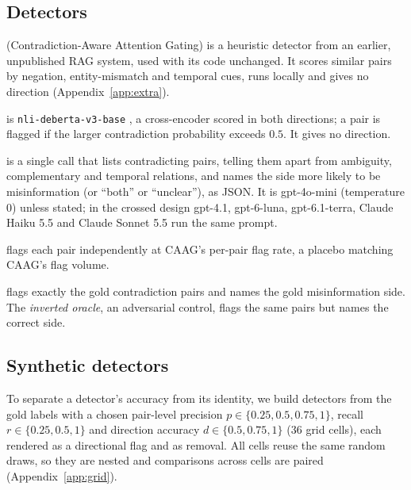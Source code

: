 \subsection{Detectors}
\label{sec:detectors}
\begin{description}[leftmargin=0pt,itemsep=1pt,topsep=2pt]
\item[CAAG] (Contradiction-Aware Attention Gating) is a heuristic detector from an earlier, unpublished RAG system,
used with its code unchanged. It scores similar pairs by negation, entity-mismatch and temporal cues, runs locally
and gives no direction (Appendix~\ref{app:extra}).
\item[NLI] is \texttt{nli-deberta-v3-base} \citep{he2023debertav3}, a cross-encoder scored in both directions; a pair is
flagged if the larger contradiction probability exceeds $0.5$. It gives no direction.
\item[LLM] is a single call that lists contradicting pairs, telling them apart from ambiguity, complementary and
temporal relations, and names the side more likely to be misinformation (or ``both'' or ``unclear''), as JSON. It is
gpt-4o-mini (temperature 0) unless stated; in the crossed design gpt-4.1, gpt-6-luna, gpt-6.1-terra, Claude Haiku 5.5
and Claude Sonnet 5.5 run the same prompt.
\item[Random] flags each pair independently at CAAG's per-pair flag rate, a placebo matching CAAG's flag volume.
\item[Oracle] flags exactly the gold contradiction pairs and names the gold misinformation side. The
\emph{inverted oracle}, an adversarial control, flags the same pairs but names the correct side.
\end{description}

\subsection{Synthetic detectors}
\label{sec:synthetic}
To separate a detector's accuracy from its identity, we build detectors from the gold labels with a chosen pair-level
precision $p\in\{0.25,0.5,0.75,1\}$, recall $r\in\{0.25,0.5,1\}$ and direction accuracy $d\in\{0.5,0.75,1\}$ (36
grid cells), each rendered as a directional flag and as removal. All cells reuse the same random draws, so they are nested
and comparisons across cells are paired (Appendix~\ref{app:grid}).
